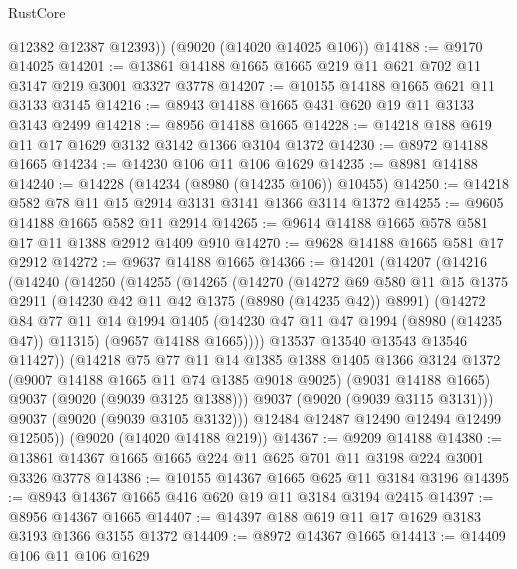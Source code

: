 \begin{lexlean}{RustCore}
\begin{coremodule}
        @12382
        @12387
        @12393))
    (@9020 (@14020 @14025 @106))
@14188 := @9170 @14025
@14201 := @13861 @14188 @1665 @1665 @219 @11 @621 @702 @11 @3147 @219 @3001 @3327 @3778
@14207 := @10155 @14188 @1665 @621 @11 @3133 @3145
@14216 := @8943 @14188 @1665 @431 @620 @19 @11 @3133 @3143 @2499
@14218 := @8956 @14188 @1665
@14228 := @14218 @188 @619 @11 @17 @1629 @3132 @3142 @1366 @3104 @1372
@14230 := @8972 @14188 @1665
@14234 := @14230 @106 @11 @106 @1629
@14235 := @8981 @14188
@14240 := @14228 (@14234 (@8980 (@14235 @106)) @10455)
@14250 := @14218 @582 @78 @11 @15 @2914 @3131 @3141 @1366 @3114 @1372
@14255 := @9605 @14188 @1665 @582 @11 @2914
@14265 := @9614 @14188 @1665 @578 @581 @17 @11 @1388 @2912 @1409 @910
@14270 := @9628 @14188 @1665 @581 @17 @2912
@14272 := @9637 @14188 @1665
@14366 := @14201
    (@14207
      (@14216
        (@14240
          (@14250
            (@14255
              (@14265
                (@14270
                  (@14272
                    @69
                    @580
                    @11
                    @15
                    @1375
                    @2911
                    (@14230 @42 @11 @42 @1375 (@8980 (@14235 @42)) @8991)
                    (@14272
                      @84
                      @77
                      @11
                      @14
                      @1994
                      @1405
                      (@14230 @47 @11 @47 @1994 (@8980 (@14235 @47)) @11315)
                      (@9657 @14188 @1665))))
                @13537
                @13540
                @13543
                @13546
                @11427))
            (@14218
              @75
              @77
              @11
              @14
              @1385
              @1388
              @1405
              @1366
              @3124
              @1372
              (@9007 @14188 @1665 @11 @74 @1385 @9018 @9025)
              (@9031 @14188 @1665)
              @9037
              (@9020 (@9039 @3125 @1388)))
            @9037
            (@9020 (@9039 @3115 @3131)))
          @9037
          (@9020 (@9039 @3105 @3132)))
        @12484
        @12487
        @12490
        @12494
        @12499
        @12505))
    (@9020 (@14020 @14188 @219))
@14367 := @9209 @14188
@14380 := @13861 @14367 @1665 @1665 @224 @11 @625 @701 @11 @3198 @224 @3001 @3326 @3778
@14386 := @10155 @14367 @1665 @625 @11 @3184 @3196
@14395 := @8943 @14367 @1665 @416 @620 @19 @11 @3184 @3194 @2415
@14397 := @8956 @14367 @1665
@14407 := @14397 @188 @619 @11 @17 @1629 @3183 @3193 @1366 @3155 @1372
@14409 := @8972 @14367 @1665
@14413 := @14409 @106 @11 @106 @1629

\end{coremodule}
\end{lexlean}
